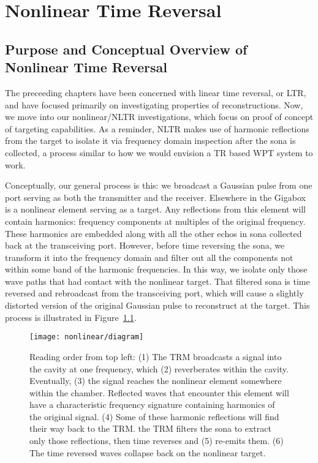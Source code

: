 \chapter{Nonlinear Time Reversal}
\label{ch:nltr}

\section{Purpose and Conceptual Overview of Nonlinear Time Reversal}
\label{sec:nltr-purpose}

The preceeding chapters have been concerned with linear time reversal, or LTR, and have focused primarily on investigating properties of reconstructions. Now, we move into our nonlinear/NLTR investigations, which focus on proof of concept of targeting capabilities. As a reminder, NLTR makes use of harmonic reflections from the target to isolate it via frequency domain inspection after the sona is collected, a process similar to how we would envision a TR based WPT system to work. 

Conceptually, our general process is this: we broadcast a Gaussian pulse from one port serving as both the transmitter and the receiver. Elsewhere in the Gigabox is a nonlinear element serving as a target. Any reflections from this element will contain harmonics: frequency components at multiples of the original frequency. These harmonics are embedded along with all the other echos in sona collected back at the transceiving port. However, before time reversing the sona, we transform it into the frequency domain and filter out all the components not within some band of the harmonic frequencies. In this way, we isolate only those wave paths that had contact with the nonlinear target. That filtered sona is time reversed and rebroadcast from the transceiving port, which will cause a slightly distorted version of the original Gaussian pulse to reconstruct at the target. This process is illustrated in Figure~\ref{fig:nonlinear-diagram}.

\begin{figure}[h!]
\centering
\texttt{[image: nonlinear/diagram]}
    \caption[Conceptual overview of nonlinear time reversal]{Reading order from top left: (1) The TRM broadcasts a signal into the cavity at one frequency, which (2) reverberates within the cavity. Eventually, (3) the signal reaches the nonlinear element somewhere within the chamber. Reflected waves that encounter this element will have a characteristic frequency signature containing harmonics of the original signal. (4) Some of these harmonic reflections will find their way back to the TRM. the TRM filters the sona to extract only those reflections, then time reverses and (5) re-emits them. (6) The time reversed waves collapse back on the nonlinear target.}
    \label{fig:nonlinear-diagram}
\end{figure}

